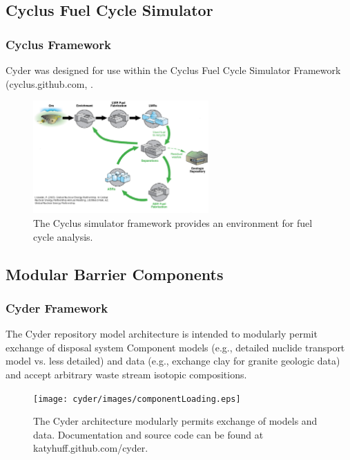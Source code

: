 
\subsection{Cyclus Fuel Cycle Simulator}

\begin{frame}[ctb!]
  \frametitle{Cyclus Framework}
  \footnotesize{
  Cyder was designed for use within the Cyclus Fuel Cycle Simulator Framework 
  (cyclus.github.com, \cite{huff_cyclus:_2010}.
  \begin{figure}[htb!]
    \begin{center}
      \includegraphics[width=0.6\textwidth]{./cyder/images/simulations.eps}
    \end{center}
    \caption{The Cyclus simulator framework provides an environment for fuel 
    cycle analysis.}
    \label{fig:simulations}
  \end{figure}
}
\end{frame}

\subsection{Modular Barrier Components}

\begin{frame}[ctb!]
  \frametitle{Cyder Framework}
  \footnotesize{
The Cyder repository model architecture is intended to modularly permit 
exchange of disposal system Component models (e.g., detailed nuclide transport 
model vs. less detailed) and data (e.g., exchange clay for granite geologic 
data) and accept arbitrary waste stream isotopic compositions.  
  \begin{figure}[htbp!]
    \begin{center}
      \texttt{[image: cyder/images/componentLoading.eps]}
      \caption{The Cyder architecture modularly permits exchange of models and 
      data. Documentation and source code can be found at katyhuff.github.com/cyder.}
    \end{center}
  \end{figure}
}
\end{frame}

